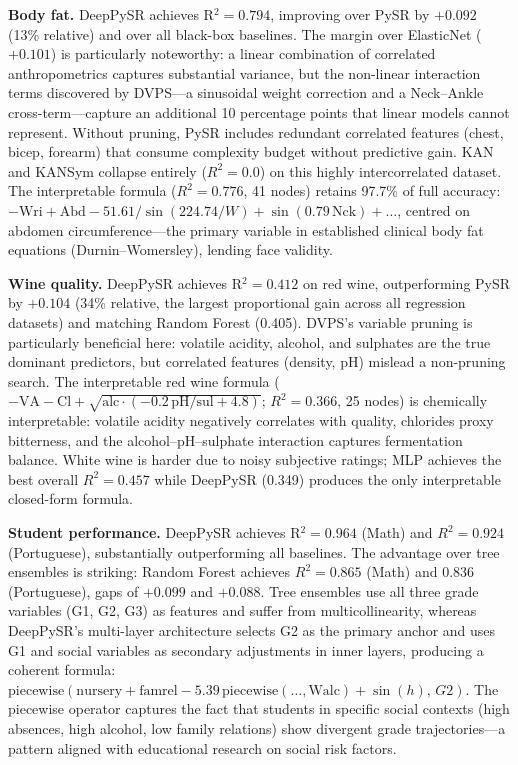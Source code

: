 \documentclass[10pt,twocolumn]{article}
\begin{document}
\textbf{Body fat.}  DeepPySR achieves R$^2 = 0.794$, improving over PySR by
$+0.092$ (13\% relative) and over all black-box baselines.  The margin over
ElasticNet ($+0.101$) is particularly noteworthy: a linear combination of
correlated anthropometrics captures substantial variance, but the non-linear
interaction terms discovered by DVPS—a sinusoidal weight correction and a
Neck–Ankle cross-term—capture an additional 10 percentage points that linear
models cannot represent.  Without pruning, PySR includes redundant correlated
features (chest, bicep, forearm) that consume complexity budget without
predictive gain.  KAN and KANSym collapse entirely ($R^2 = 0.0$) on this
highly intercorrelated dataset.  The interpretable formula ($R^2 = 0.776$,
41 nodes) retains 97.7\% of full accuracy: $-\text{Wri} + \text{Abd}
- 51.61/\sin(224.74/W) + \sin(0.79\,\text{Nck}) + \ldots$, centred on
abdomen circumference—the primary variable in established clinical body fat
equations (Durnin–Womersley), lending face validity.

\textbf{Wine quality.}  DeepPySR achieves R$^2 = 0.412$ on red wine,
outperforming PySR by $+0.104$ (34\% relative, the largest proportional gain
across all regression datasets) and matching Random Forest (0.405).  DVPS's
variable pruning is particularly beneficial here: volatile acidity, alcohol,
and sulphates are the true dominant predictors, but correlated features
(density, pH) mislead a non-pruning search.  The interpretable red wine formula
($-\text{VA} - \text{Cl} + \sqrt{\text{alc}\cdot(-0.2\,\text{pH}/\text{sul}+4.8)}$;
$R^2 = 0.366$, 25 nodes) is chemically interpretable: volatile acidity
negatively correlates with quality, chlorides proxy bitterness, and the
alcohol–pH–sulphate interaction captures fermentation balance.  White wine is
harder due to noisy subjective ratings; MLP achieves the best overall
$R^2 = 0.457$ while DeepPySR (0.349) produces the only interpretable
closed-form formula.

\textbf{Student performance.}  DeepPySR achieves R$^2 = 0.964$ (Math) and
$R^2 = 0.924$ (Portuguese), substantially outperforming all baselines.  The
advantage over tree ensembles is striking: Random Forest achieves $R^2 = 0.865$
(Math) and 0.836 (Portuguese), gaps of $+0.099$ and $+0.088$.  Tree ensembles
use all three grade variables (G1, G2, G3) as features and suffer from
multicollinearity, whereas DeepPySR's multi-layer architecture selects G2 as
the primary anchor and uses G1 and social variables as secondary adjustments in
inner layers, producing a coherent formula: $\mathrm{piecewise}(\text{nursery}
+ \text{famrel} - 5.39\,\mathrm{piecewise}(\ldots,\text{Walc}) + \sin(h),\,G2)$.
The piecewise operator captures the fact that students in specific social
contexts (high absences, high alcohol, low family relations) show divergent
grade trajectories—a pattern aligned with educational research on social risk
factors.
\end{document}
